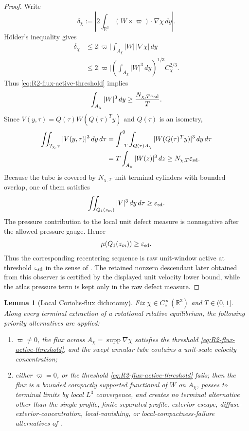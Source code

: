 \documentclass[11pt]{amsart}
\numberwithin{equation}{section}
\theoremstyle{plain}
\newtheorem{lemma}[lemma]{Lemma}
\theoremstyle{definition}
\theoremstyle{remark}
\newcommand{\eps}{\varepsilon}
\begin{document}
\begin{proof}
Write
\[
   \delta_\chi:=
   \left|
      2\int_{\mathbb R^3}(W\times\varpi)\cdot\nabla\chi\,dy
   \right| .
\]
H\"older's inequality gives
\[
\begin{aligned}
   \delta_\chi
   &\le
   2|\varpi|\int_{A_\chi}|W|\,|\nabla\chi|\,dy  \\
   &\le
   2|\varpi|
   \left(\int_{A_\chi}|W|^3\,dy\right)^{1/3}
   C_\chi^{2/3}.
\end{aligned}
\]
Thus \eqref{eq:R2-flux-active-threshold} implies
\[
   \int_{A_\chi}|W|^3\,dy\ge \frac{N_{\chi,T}\eps_{\rm sd}}{T}.
\]
Since \(V(y,\tau)=Q(\tau)W(Q(\tau)^Ty)\) and \(Q(\tau)\) is an isometry,
\[
\begin{aligned}
   \iint_{\mathcal T_{\chi,T}} |V(y,\tau)|^3\,dy\,d\tau
   &=
   \int_{-T}^{0}\int_{Q(\tau)A_\chi}
      |W(Q(\tau)^Ty)|^3\,dy\,d\tau \\
   &=
   T\int_{A_\chi}|W(z)|^3\,dz
   \ge N_{\chi,T}\eps_{\rm sd}.
\end{aligned}
\]
Because the tube is covered by \(N_{\chi,T}\) unit terminal cylinders with
bounded overlap, one of
them satisfies
\[
   \iint_{Q_1(z_m)} |V|^3\,dy\,d\tau\ge \eps_{\rm sd}.
\]
The pressure contribution to the local unit defect measure is nonnegative after the
allowed pressure gauge.  Hence
\[
   \mu(Q_1(z_m))\ge \eps_{\rm sd}.
\]
Thus the corresponding recentering sequence is raw unit-window active at
threshold \(\eps_{\rm sd}\) in the sense of .
The retained nonzero descendant later obtained from this observer is certified
by the displayed unit velocity lower bound, while the atlas pressure term is
kept only in the raw defect measure.
\end{proof}

\begin{lemma}[Local Coriolis-flux dichotomy]
\label{lem:R2-flux-reduction-dichotomy}
Fix \(\chi\in C_c^\infty(\mathbb R^3)\) and \(T\in(0,1]\).  Along every
terminal extraction of a rotational relative equilibrium, the following
priority alternatives are applied:
\begin{enumerate}[label=(\roman*)]
   \item \(\varpi\ne0\), the flux across
   \(A_\chi=\operatorname{supp}\nabla\chi\) satisfies the threshold
   \eqref{eq:R2-flux-active-threshold}, and the swept annular tube contains a
   unit-scale velocity concentration;
   \item either \(\varpi=0\), or the threshold
   \eqref{eq:R2-flux-active-threshold} fails; then the flux is a bounded
   compactly supported functional of \(W\) on \(A_\chi\), passes to terminal
   limits by local \(L^3\) convergence, and creates no terminal alternative other than
   the single-profile, finite separated-profile, exterior-escape,
   diffuse-exterior-concentration, local-vanishing, or
   local-compactness-failure alternatives of
      .
\end{enumerate}
\end{lemma}
\end{document}
